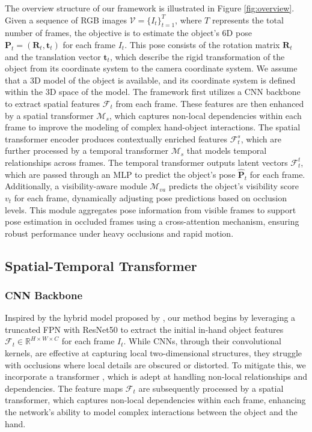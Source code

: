 The overview structure of our framework is illustrated in Figure \ref{fig:overview}. Given a sequence of RGB images $\mathcal{V} = \lbrace I_t \rbrace_{t=1}^{T}$, where $T$ represents the total number of frames, the objective is to estimate the object's 6D pose $\mathbf{P}_t = (\mathbf{R}_t, \mathbf{t}_t)$ for each frame $I_t$. This pose consists of the rotation matrix $\mathbf{R}_t$ and the translation vector $\mathbf{t}_t$, which describe the rigid transformation of the object from its coordinate system to the camera coordinate system. We assume that a 3D model of the object is available, and its coordinate system is defined within the 3D space of the model. The framework first utilizes a CNN backbone to extract spatial features \( \mathcal{F}_t \) from each frame. These features are then enhanced by a spatial transformer $\mathcal{M}_{s}$, which captures non-local dependencies within each frame to improve the modeling of complex hand-object interactions. The spatial transformer encoder produces contextually enriched features \( \mathcal{F}^s_t \), which are further processed by a temporal transformer $\mathcal{M}_{s}$ that models temporal relationships across frames. The temporal transformer outputs latent vectors \( \mathcal{F}^t_t \), which are passed through an MLP to predict the object's pose \( \hat{\mathbf{P}}_t \) for each frame. Additionally, a visibility-aware module $\mathcal{M}_{va}$ predicts the object's visibility score \( v_t \) for each frame, dynamically adjusting pose predictions based on occlusion levels. This module aggregates pose information from visible frames to support pose estimation in occluded frames using a cross-attention mechanism, ensuring robust performance under heavy occlusions and rapid motion.

\subsection{Spatial-Temporal Transformer}

\subsubsection{CNN Backbone}

Inspired by the hybrid model proposed by \cite{carion2020end}, our method begins by leveraging a truncated FPN \cite{lin2017feature} with ResNet50 \cite{he2016deep} to extract the initial in-hand object features $\mathcal{F}_t \in \mathbb{R}^{H \times W \times C}$ for each frame $I_t$. While CNNs, through their convolutional kernels, are effective at capturing local two-dimensional structures, they struggle with occlusions where local details are obscured or distorted. To mitigate this, we incorporate a transformer \cite{vaswani2017attention}, which is adept at handling non-local relationships and dependencies. The feature maps $\mathcal{F}_t$ are subsequently processed by a spatial transformer, which captures non-local dependencies within each frame, enhancing the network's ability to model complex interactions between the object and the hand.

